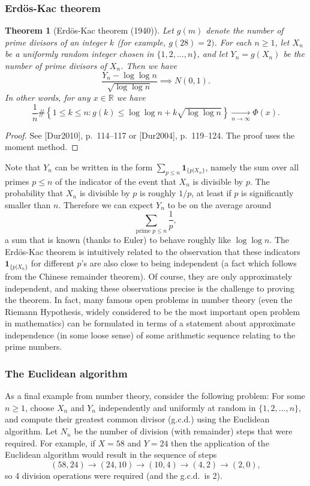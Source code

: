 \documentclass[12pt]{article}
\newtheorem{thm}{Theorem}[section]
\newcommand{\R}{\mathbb{R}}
\newcommand{\ind}{\textbf{1}}
\theoremstyle{example}
\begin{document}
\subsubsection{Erd\"os-Kac theorem}

\begin{thm}[Erd\"os-Kac theorem (1940)] Let $g(m)$ denote the number of prime divisors of an integer $k$ (for example, $g(28)=2)$. For each $n\ge 1$, let $X_n$ be a uniformly random integer chosen in $\{1,2,\ldots,n\}$, and let $Y_n=g(X_n)$ be the number of prime divisors of $X_n$. Then we have
$$ \frac{Y_n - \log\log n}{\sqrt{\log\log n}} \implies N(0,1). $$
In other words, for any $x\in\R$ we have
$$ \frac{1}{n}\# \left\{ 1\le k\le n: g(k) \le \log\log n + k \sqrt{\log\log n} \right\} \xrightarrow[n\to\infty]{} \Phi(x). $$
\end{thm}

\begin{proof} See [Dur2010], p.\ 114--117 or [Dur2004], p.\ 119--124. The proof uses the moment method.
\end{proof}

Note that $Y_n$ can be written in the form $\sum_{p\le n} \ind_{\{p | X_n\}}$, namely the sum over all primes $p\le n$ of the indicator of the event that $X_n$ is divisible by $p$. The probability that $X_n$ is divisible by $p$ is roughly $1/p$, at least if $p$ is significantly smaller than $n$. Therefore we can expect $Y_n$  to be on the average around
$$ \sum_{\textrm{prime }p\le n} \frac{1}{p}, $$
a sum that is known (thanks to Euler) to behave roughly like $\log\log n$. The Erd\"os-Kac theorem is intuitively related to the observation that these indicators $\ind_{\{p | X_n\}}$ for different $p$'s are also close to being independent (a fact which follows from the Chinese remainder theorem). Of course, they are only approximately independent, and making these observations precise is the challenge to proving the theorem. In fact, many famous open problems in number theory (even the Riemann Hypothesis, widely considered to be the most important open problem in mathematics) can be formulated in terms of a statement about approximate independence (in some loose sense) of some arithmetic sequence relating to the prime numbers.

\subsubsection{The Euclidean algorithm}

As a final example from number theory, consider the following problem: For some $n\ge 1$, choose $X_n$ and $Y_n$ independently and uniformly at random in $\{1,2,\ldots,n\}$, and compute their greatest common divisor (g.c.d.) using the Euclidean algorithm. Let $N_n$ be the number of division (with remainder) steps that were required. For example, if $X = 58$ and $Y=24$ then the application of the Euclidean algorithm would result in the sequence of steps
$$ (58,24) \to (24,10) \to (10,4) \to (4,2) \to (2,0), $$
so 4 division operations were required (and the g.c.d.\ is 2).
\end{document}
